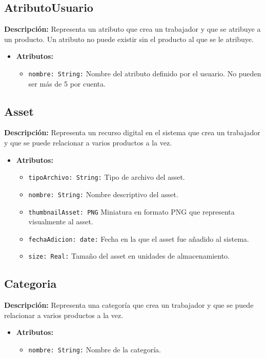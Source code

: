 \documentclass[12pt.a4paper]{article}
\begin{document}
\subsection{AtributoUsuario}
\textbf{Descripción:} Representa un atributo que crea un trabajador y que se atribuye a un producto. Un atributo no puede existir sin el producto al que se le atribuye.
    \begin{itemize}
        \item {\textbf{Atributos:}}
        \begin{itemize}
            \item \texttt{nombre: String:} Nombre del atributo definido por el usuario. No pueden ser más  de 5 por cuenta.
        \end{itemize}
    \end{itemize}

\subsection{Asset}
\textbf{Descripción:} Representa un recurso digital en el sistema que crea un trabajador y que se puede relacionar a varios productos a la vez.
    \begin{itemize}
        \item {\textbf{Atributos:}}
        \begin{itemize}
            \item \texttt{tipoArchivo: String:} Tipo de archivo del asset.
            \item \texttt{nombre: String:} Nombre descriptivo del asset.
            \item \texttt{thumbnailAsset: PNG} Miniatura en formato PNG que representa visualmente al asset.
            \item \texttt{fechaAdicion: date:} Fecha en la que el asset fue añadido al sistema.
            \item \texttt{size: Real:} Tamaño del asset en unidades de almacenamiento.
        \end{itemize}
    \end{itemize}

\subsection{Categoria}
\textbf{Descripción:} Representa una categoría que crea un trabajador y que se puede relacionar a varios productos a la vez.
    \begin{itemize}
        \item {\textbf{Atributos:}}
        \begin{itemize}
            \item \texttt{nombre: String:} Nombre de la categoría.
        \end{itemize}
    \end{itemize}
\end{document}
